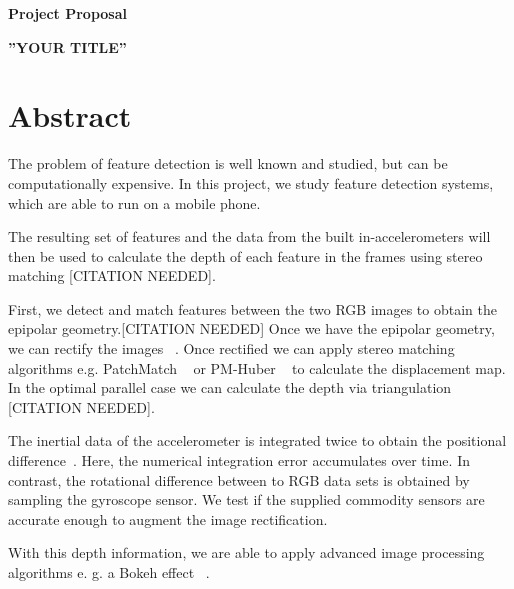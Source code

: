 \documentclass[a4paper,pagesize 10pt]{scrartcl}
\begin{document}
\begin{center}{\Huge\textbf{Project Proposal}}\end{center}
\begin{center}{\Large\textbf{''YOUR TITLE''}}\end{center}

\section{Abstract}

%
%
%
%
%
The problem of feature detection is well known and studied, but can be computationally expensive. In this project, we study feature detection systems, which are able to run on a mobile phone. 

The resulting set of features and the data from the built in-accelerometers will then be used to calculate the depth of each feature in the frames using stereo matching [CITATION NEEDED].

First, we detect and match features between the two RGB images to obtain the epipolar geometry.[CITATION NEEDED]
Once we have the epipolar geometry, we can rectify the images ~\cite{loop1999}. Once rectified we can apply stereo matching algorithms e.g. PatchMatch ~\cite{Bleyer2011} or PM-Huber ~\cite{Heise2013} to calculate the displacement map. In the optimal parallel case we can calculate the depth via triangulation [CITATION NEEDED]. 

The inertial data of the accelerometer is integrated twice to obtain the positional difference~\cite{Seifert2007}. Here, the numerical integration error accumulates over time. In contrast, the rotational difference between to RGB data sets is obtained by sampling the gyroscope sensor. We test if the supplied commodity sensors are accurate enough to augment the image rectification.

With this depth information, we are able to apply advanced image processing algorithms e. g. a Bokeh effect ~\cite{Lee2008}.

\end{document}
